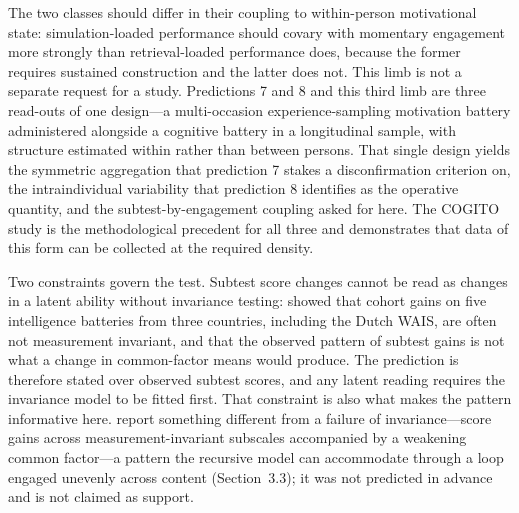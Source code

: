 \documentclass[12pt,a4paper]{article}
\begin{document}
The two classes should differ in their coupling to within-person motivational state: simulation-loaded performance should covary with momentary engagement more strongly than retrieval-loaded performance does, because the former requires sustained construction and the latter does not. This limb is not a separate request for a study. Predictions 7 and 8 and this third limb are three read-outs of one design---\hspace{0pt}a multi-occasion experience-sampling motivation battery administered alongside a cognitive battery in a longitudinal sample, with structure estimated within rather than between persons. That single design yields the symmetric aggregation that prediction 7 stakes a disconfirmation criterion on, the intraindividual variability that prediction 8 identifies as the operative quantity, and the subtest-by-engagement coupling asked for here. The COGITO study \citep{Brose2010,Schmiedek2020} is the methodological precedent for all three and demonstrates that data of this form can be collected at the required density.

Two constraints govern the test. Subtest score changes cannot be read as changes in a latent ability without invariance testing: \citet{Wicherts2004} showed that cohort gains on five intelligence batteries from three countries, including the Dutch WAIS, are often not measurement invariant, and that the observed pattern of subtest gains is not what a change in common-factor means would produce. The prediction is therefore stated over observed subtest scores, and any latent reading requires the invariance model to be fitted first. That constraint is also what makes the pattern informative here. \citet{Oberleiter2024} report something different from a failure of invariance---\hspace{0pt}score gains across measurement-invariant subscales accompanied by a weakening common factor---\hspace{0pt}a pattern the recursive model can accommodate through a loop engaged unevenly across content (Section~3.3); it was not predicted in advance and is not claimed as support.
\end{document}
